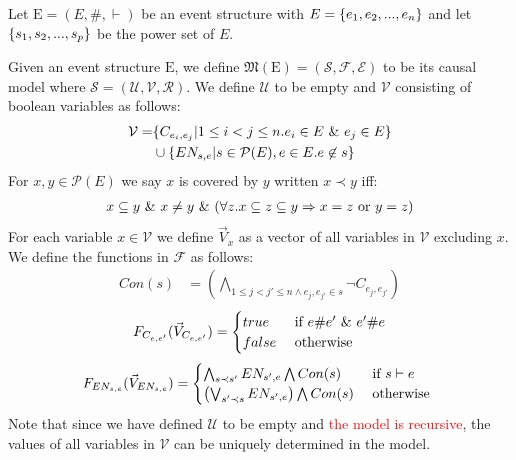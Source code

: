 Let $\mathrm{E} = (E,\#,\vdash)$ be an event structure with
$E = \{e_1, e_2, ...,e_n\}$ and let $\{s_1,s_2,...,s_p\}$ be the power set of $E$.

Given an event structure $\mathrm{E}$, we define
$\mathfrak{M}(\mathrm{E}) = (\mathcal{S},\mathscr{F},\mathcal{E})$
to be its causal model where
$\mathcal{S} = (\mathcal{U},\mathcal{V},\mathcal{R})$.
We define $\mathcal{U}$ to be empty and $\mathcal{V}$ consisting
of boolean variables as follows:
\begin{align*}
    \mathcal{V} = & \{C_{e_i,e_j} |  1 \leq i < j \leq n.
    e_i \in E \ \& \  e_j \in E\}                                \\
                  & \cup \{EN_{s,e} | s \in \mathcal{P}(E),
    e \in E. e \not \in s \}                                  \\
\end{align*}
For $x,y \in \mathcal{P}(E)$ we say $x$ is covered by $y$ written $ x \prec y$ iff:
\begin{align*}
    x \subseteq y \ \& \  x \neq y \ \& \ 
    (\forall z. x \subseteq z \subseteq y \Rightarrow x = z
    \text{ or } y = z)
\end{align*}
For each variable $x \in \mathcal{V}$ we define $\vec V_x$ as a vector
of all variables in $\mathcal{V}$ excluding $x$.
We define the functions in $\mathscr{F}$ as follows:
\begin{align*}
    Con(s) & =   \left(
    \bigwedge_{ 1\leq j<j' \leq n \wedge e_j,e_{j'} \in s}
    \neg C_{e_j,e_{j'}}
    \right)
\end{align*}
$$
    F_{C_{e,e'}}(\vec V_{C_{e,e'}}) = \begin{cases}
        true  & \text{ if } e \# e' \ \& \  e' \# e \\
        false & \text{ otherwise }
    \end{cases}
$$
$$
    F_{EN_{s,e}}(\vec V_{EN_{s,e}}) = \begin{cases}
        \bigwedge_{s\prec s'} EN_{s',e} 
        \bigwedge Con(s) & \text{ if } s \vdash e \\
        \left( \bigvee_{s'\prec s}EN_{s',e} \right)
        \bigwedge Con(s) & \text{ otherwise }
    \end{cases}
$$
Note that since we have defined $\mathcal{U}$ to be empty and
\textcolor{red}{the model is recursive}, the values of all variables in
$\mathcal{V}$ can be uniquely determined in the model.

